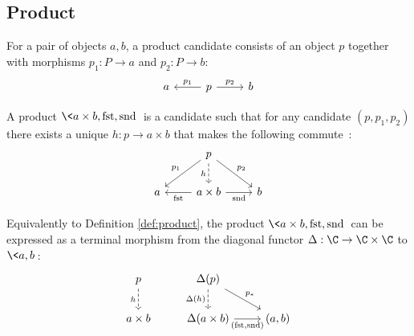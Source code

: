\subsection{Product}

\begin{definition}

	For a pair of objects $a, b$, a product candidate consists of an object $p$
	together with morphisms $p_1: P\to a$ and $p_2:P\to b$:
	\[\begin{tikzcd}[ampersand replacement=\&]
		a \& p \& b
		\arrow["{p_1}"', from=1-2, to=1-1]
		\arrow["{p_2}", from=1-2, to=1-3]
	\end{tikzcd}\]

	A product $\<a\times b, \mathrm{fst}, \mathrm{snd}\>$ is a candidate such that
	for any candidate $(p, p_1, p_2)$ there exists a unique $h: p\to a\times b$
	that makes the following
	commute~\parencite[p.~108]{leinster:basic_category_theory}:
	\[\begin{tikzcd}[ampersand replacement=\&]
		\& p \\
		a \& {a\times b} \& b
		\arrow["{\mathrm{fst}}", from=2-2, to=2-1]
		\arrow["{\mathrm{snd}}"', from=2-2, to=2-3]
		\arrow["{p_1}"', from=1-2, to=2-1]
		\arrow["{p_2}", from=1-2, to=2-3]
		\arrow["h"', dashed, from=1-2, to=2-2]
	\end{tikzcd}\]
\end{definition}

\begin{definition}
	Equivalently to Definition \ref{def:product}, the product $\<a\times b,
	\mathrm{fst}, \mathrm{snd}\>$ can be expressed as a terminal morphism from the diagonal functor $\Delta: \C \to \C\times \C$ to $\<a, b\>$:
	\[\begin{tikzcd}[ampersand replacement=\&]
		p \& {\Delta(p)} \\
		{a\times b} \& {\Delta(a\times b)} \& {(a,b)}
		\arrow["h"', dashed, from=1-1, to=2-1]
		\arrow["{\Delta(h)}"', dashed, from=1-2, to=2-2]
		\arrow["{p_*}", from=1-2, to=2-3]
		\arrow["{(\mathrm{fst}, \mathrm{snd})}"', from=2-2, to=2-3]
	\end{tikzcd}\]

\end{definition}

